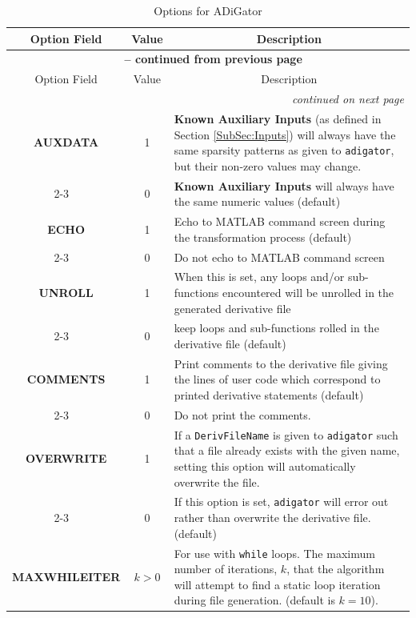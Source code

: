 \documentclass[10pt,pdftex]{article}
\begin{document}
\begin{longtable}{|c|c|p{9.9cm}|}
\caption{Options for ADiGator \label{Tab:Options}}\\
\hline
\multicolumn{1}{|c|}{Option Field} & Value & \multicolumn{1}{c|}{Description}  \\ \hline
\endfirsthead
\multicolumn{3}{c}{{\bfseries \tablename\ \thetable{} -- continued from previous page}}\\
\hline
\multicolumn{1}{|c|}{Option Field} & Value & \multicolumn{1}{c|}{Description}  \\ \hline
\endhead
\hline \multicolumn{3}{r}{\emph{continued on next page}}\\
\endfoot
\hline
\endlastfoot
{\bf AUXDATA} & 1 & {\bf Known Auxiliary Inputs} (as defined in Section \ref{SubSec:Inputs})  will always have the same sparsity patterns as given to \texttt{adigator}, but their non-zero values may change. 
\\ \cline{2-3}
~ & 0 & {\bf Known Auxiliary Inputs} will always have the same numeric values (default) \\ \hline
{\bf ECHO} & 1 & Echo to MATLAB command screen during the transformation process (default) \\ \cline{2-3}
~ & 0 & Do not echo to MATLAB command screen \\ \hline
{\bf UNROLL} & 1 & When this is set, any loops and/or sub-functions encountered will be unrolled in the generated derivative file \\ \cline{2-3}
~ & 0 & keep loops and sub-functions rolled in the derivative file (default) \\ \hline
{\bf COMMENTS} & 1 & Print  comments to the derivative file giving the lines of user code which correspond to printed derivative statements (default) \\ \cline{2-3} 
~ & 0 & Do not print the comments. \\ \hline
{\bf OVERWRITE} & 1 & If a \texttt{DerivFileName} is given to \texttt{adigator} such that a file already exists with the given name, setting this option will automatically overwrite the file. \\ \cline{2-3} 
~ & 0 & If this option is set, \texttt{adigator} will error out rather than overwrite the derivative file. (default)\\ \hline
{\bf MAXWHILEITER} & $k > 0$ & For use with \texttt{while} loops. The maximum number of iterations, $k$, that the algorithm will attempt to find a static loop iteration during file generation. (default is $k = 10$).\\ \hline

\end{longtable}
\end{document}
